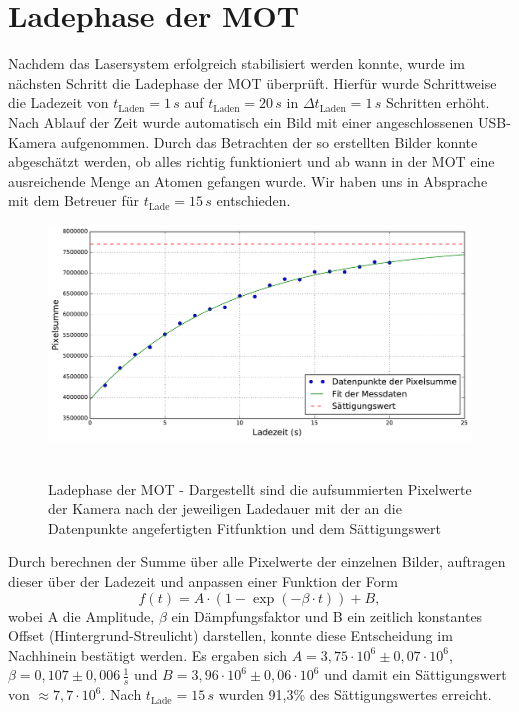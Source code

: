 \documentclass[twoside,colorback,accentcolor=tud4c,11pt]{tudreport}
\begin{document}
\section{Ladephase der MOT}
Nachdem das Lasersystem erfolgreich stabilisiert werden konnte, wurde im nächsten Schritt die Ladephase der MOT überprüft. Hierfür wurde Schrittweise die Ladezeit von $t_{\text{Laden}}=1\,\si{s}$ auf $t_{\text{Laden}}=20\,\si{s}$ in $\Delta t_{\text{Laden}}=1\,\si{s}$ Schritten erhöht. Nach Ablauf der Zeit wurde automatisch ein Bild mit einer angeschlossenen USB-Kamera aufgenommen. Durch das Betrachten der so erstellten Bilder konnte abgeschätzt werden, ob alles richtig funktioniert und ab wann in der MOT eine ausreichende Menge an Atomen gefangen wurde. Wir haben uns in Absprache mit dem Betreuer für $t_{\text{Lade}}=15\,\si{s}$ entschieden. 
\begin{figure}[H]
\centering
   	\begin{minipage}[b]{0.75\textwidth}
   	\includegraphics[width=\textwidth]{graphics/laden.pdf}\
   	\end{minipage}
\caption{Ladephase der MOT - Dargestellt sind die aufsummierten Pixelwerte der Kamera nach der jeweiligen Ladedauer mit der an die Datenpunkte angefertigten Fitfunktion und dem Sättigungswert}\label{laden}	
\end{figure}
Durch berechnen der Summe über alle Pixelwerte der einzelnen Bilder, auftragen dieser über der Ladezeit und anpassen einer Funktion der Form
\begin{equation}
f(t)=A\cdot\left(1-\exp\left(-\beta\cdot t\right)\right) + B,
\end{equation}
wobei A die Amplitude, $\beta$ ein Dämpfungsfaktor und B ein zeitlich konstantes Offset (Hintergrund-Streulicht) darstellen, konnte diese Entscheidung im Nachhinein bestätigt werden. Es ergaben sich $A=3,75\cdot 10^6 \pm 0,07\cdot 10^6$, $\beta=0,107\pm 0,006\,\frac{1}{s}$ und $B=3,96\cdot 10^6 \pm 0,06\cdot 10^6$ und damit ein Sättigungswert von $\approx7,7\cdot 10^6$. Nach $t_{\text{Lade}}=15\,\si{s}$ wurden 91,3\% des Sättigungswertes erreicht.
\end{document}

